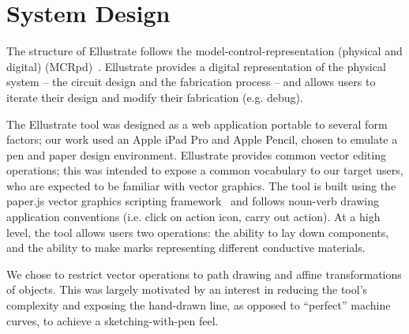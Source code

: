\documentclass{sigchi}
\begin{document}
\section{System Design}
The structure of Ellustrate follows the model-control-representation (physical and digital) (MCRpd)~\cite{ullmer2000emerging}. Ellustrate provides a digital representation of the physical system -- the circuit design and the fabrication process -- and allows users to iterate their design and modify their fabrication (e.g. debug). 

    The Ellustrate tool was designed as a web application portable to several form factors; our work used an Apple iPad Pro and Apple Pencil, chosen to emulate a pen and paper design environment. Ellustrate provides common vector editing operations; this was intended to expose a common vocabulary to our target users, who are expected to be familiar with vector graphics. The tool is built using the paper.js vector graphics scripting framework~\cite{lehni_paperjs_2011} and follows noun-verb drawing application conventions (i.e. click on action icon, carry out action). At a high level, the tool allows users two operations: the ability to lay down components, and the ability to make marks representing different conductive materials.

    We chose to restrict vector operations to path drawing and affine transformations of objects. This was largely motivated by an interest in reducing the tool's complexity and exposing the hand-drawn line, as opposed to ``perfect'' machine curves, to achieve a sketching-with-pen feel.
\end{document}
